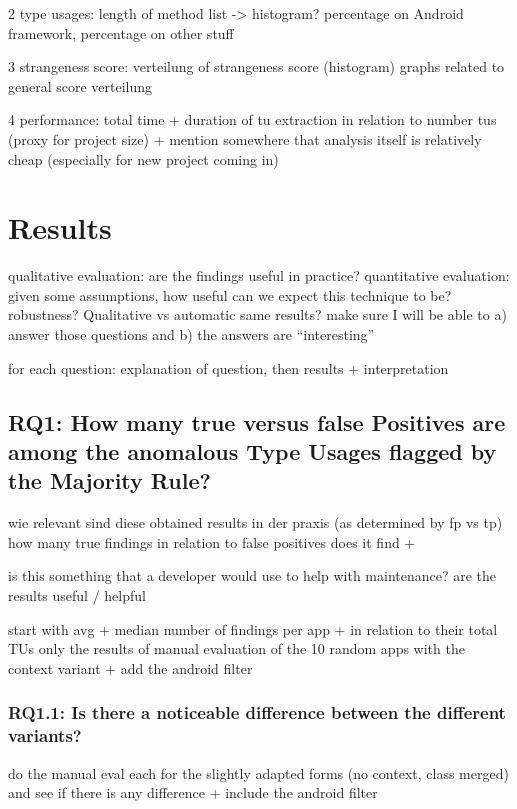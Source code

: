 2 type usages:
    length of method list -> histogram?
    percentage on Android framework, percentage on other stuff

3 strangeness score:
    verteilung of strangeness score (histogram)
    graphs related to general score verteilung

4 performance:
    total time +
    duration of tu extraction in relation to number tus (proxy for project size)
    + mention somewhere that analysis itself is relatively cheap (especially for new project coming in)

\section{Results}

qualitative evaluation: are the findings useful in practice?
quantitative evaluation: given some assumptions, how useful can we expect this technique to be? robustness? Qualitative vs automatic same results?
make sure I will be able to a) answer those questions and b) the answers are ``interesting''

for each question: explanation of question, then results + interpretation

\subsection{RQ1: How many true versus false Positives are among the anomalous Type Usages flagged by the Majority Rule?}

wie relevant sind diese obtained results in der praxis (as determined by fp vs tp)
how many true findings in relation to false positives does it find + 

is this something that a developer would use to help with maintenance?
are the results useful / helpful

start with avg + median number of findings per app + in relation to their total TUs
only the results of manual evaluation of the 10 random apps with the context variant
+ add the android filter

\subsubsection{RQ1.1: Is there a noticeable difference between the different variants?}

do the manual eval each for the slightly adapted forms (no context, class merged) and see if there is any difference
+ include the android filter


